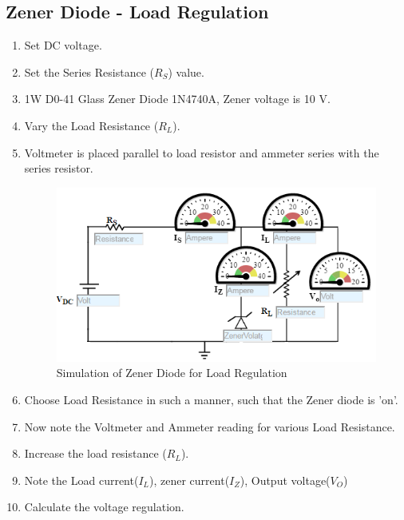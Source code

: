 			\subsection{Zener Diode - Load Regulation}
				\begin{enumerate}
					\tightlist
					\item Set DC voltage.
					\item Set the Series Resistance ($R_S$) value.
					\item 1W D0-41 Glass Zener Diode 1N4740A, Zener voltage is 10 V.
					\item Vary the Load Resistance ($R_L$).
					\item Voltmeter is placed parallel to load resistor and ammeter series with the series resistor.
					\begin{figure}[h]
						\centering
						\includegraphics[width=0.5\linewidth]{img/exp8/6}
						\caption{Simulation of Zener Diode for Load Regulation}
						\label{fig:zener_Procedure_loadRegulation}
					\end{figure}
					\item Choose Load Resistance in such a manner, such that the Zener diode is 'on'.
					\item Now note the Voltmeter and Ammeter reading for various Load Resistance.
					\item Increase the load resistance ($R_L$).
					\item Note the Load current($I_L$), zener current($I_Z$), Output voltage($V_O$)
					\item Calculate the voltage regulation.
				\end{enumerate}
			
